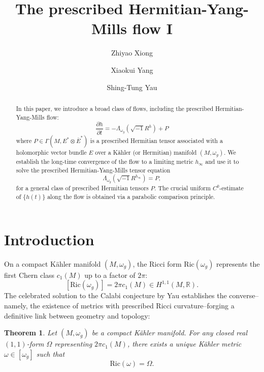 \documentclass[12pt, reqno]{amsart}
\title{The prescribed Hermitian-Yang-Mills flow I}
\author{Zhiyao Xiong}
\author{Xiaokui Yang}
\author{Shing-Tung Yau}
\theoremstyle{plain}
\newtheorem{theorem}{Theorem}[section]
\theoremstyle{definition}
\newcommand{\sq}{\sqrt{-1}}
\newcommand{\p}{\partial}
\renewcommand{\bar}{\overline}
\renewcommand{\>}{\rightarrow}
\newcommand{\R}{{\mathbb R}}
\newcommand{\Ric}{\mathrm{Ric}}
\renewcommand{\>}{\rightarrow}
\renewcommand{\p}{{\partial}}
\newcommand{\om}{\omega}
\renewcommand{\bar}{\overline}
\numberwithin{equation}{section} %
\begin{document}
    \begin{abstract} In this paper, we introduce a broad class of flows, including the prescribed Hermitian-Yang-Mills flow:
    $$\frac{\p h}{\p t}=-\Lambda_{\omega_g}\left(\sq R^h\right)+P$$
   where $P\in\Gamma(M,E^*\otimes\bar{E}^*)$ is a prescribed Hermitian tensor associated with a holomorphic vector bundle $E$ over a  K\"ahler (or Hermitian) manifold $(M,\omega_g)$.  We establish the long-time convergence of the flow to a limiting metric $h_{\infty}$ and use it to solve the prescribed Hermitian-Yang-Mills tensor equation
    $$\Lambda_{\omega_g}\left(\sq R^{h_\infty}\right)=P,
    $$
    for a general class of prescribed Hermitian tensors $P$.
    The crucial uniform $C^0$-estimate of $\{h(t)\}$ along the flow is obtained via a parabolic comparison principle.
    \end{abstract}


\baselineskip

    \section{Introduction}

    On a compact K\"ahler manifold $(M, \om_g)$, the Ricci form $\Ric(\om_g)$ represents the first Chern class $c_1(M)$ up to a factor of $2\pi$:
    \[
    [\Ric(\om_g)] = 2\pi c_1(M) \in H^{1,1}(M, \R).
    \]
    The celebrated solution to the Calabi conjecture by Yau \cite{Cal57,Yau78} establishes the converse--namely, the existence of metrics with prescribed Ricci curvature--forging a definitive link between geometry and topology:

    \setcounter{theorem}{0}
    \renewcommand{\thetheorem}{\Alph{theorem}}
        \begin{theorem}\label{thm:CY_intro}
        Let $(M, \om_g)$ be a compact K\"ahler manifold. For any closed real $(1,1)$-form $\Omega$ representing $2\pi c_1(M)$, there exists a unique K\"ahler metric $\omega \in [\om_g]$ such that
        \begin{equation}
        \Ric(\omega) = \Omega. \label{CY1}
        \end{equation}
    \end{theorem}
\end{document}
